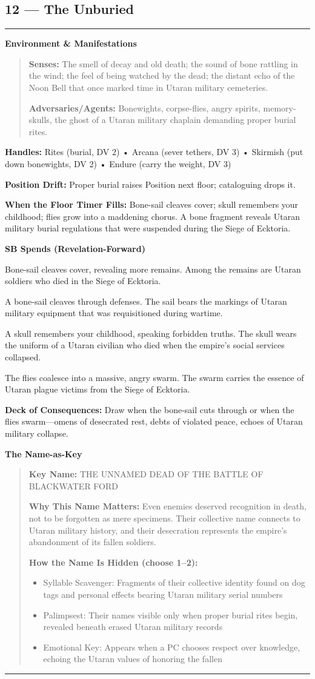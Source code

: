 \documentclass[18pt, letterpaper, twoside]{article}
\newenvironment{floorbox}[1]{%
    \begin{center}
    \begin{minipage}{0.95\textwidth}
    \subsection*{#1}
    \vspace{-0.5em}
    \rule{\textwidth}{0.5pt}
    \vspace{0.5em}
}{%
    \vspace{0.5em}
    \rule{\textwidth}{0.5pt}
    \end{minipage}
    \end{center}
}
\newenvironment{gmnote}[1]{%
    \vspace{0.5em}
    \noindent\textbf{#1}
    \begin{quote}
}{%
    \end{quote}
    \vspace{0.5em}
}
\newcommand{\handles}[1]{\noindent\textbf{Handles:} #1\par}
\newcommand{\sbitem}[2]{\item[#1 SB:] #2}
\newcommand{\deckdraw}[1]{\noindent\textbf{Deck of Consequences:} #1\par}
\newcommand{\keyname}[1]{\noindent\textbf{Key Name:} #1\par}
\newcommand{\nameimportance}[1]{\noindent\textbf{Why This Name Matters:} #1\par}
\begin{document}
\begin{floorbox}{12 --- The Unburied}
\begin{gmnote}{Environment \& Manifestations}
\textbf{Senses:} The smell of decay and old death; the sound of bone rattling in the wind; the feel of being watched by the dead; the distant echo of the Noon Bell that once marked time in Utaran military cemeteries.

\textbf{Adversaries/Agents:} Bonewights, corpse-flies, angry spirits, memory-skulls, the ghost of a Utaran military chaplain demanding proper burial rites.
\end{gmnote}

\handles{Rites (burial, DV 2) • Arcana (sever tethers, DV 3) • Skirmish (put down bonewights, DV 2) • Endure (carry the weight, DV 3)}

\textbf{Position Drift:} Proper burial raises Position next floor; cataloguing drops it.

\textbf{When the Floor Timer Fills:} Bone-sail cleaves cover; skull remembers your childhood; flies grow into a maddening chorus. A bone fragment reveals Utaran military burial regulations that were suspended during the Siege of Ecktoria.

\textbf{SB Spends (Revelation-Forward)}
\begin{description}[leftmargin=*, style=unboxed]
    \sbitem{1}{Bone-sail cleaves cover, revealing more remains. Among the remains are Utaran soldiers who died in the Siege of Ecktoria.}
    \sbitem{2}{A bone-sail cleaves through defenses. The sail bears the markings of Utaran military equipment that was requisitioned during wartime.}
    \sbitem{3}{A skull remembers your childhood, speaking forbidden truths. The skull wears the uniform of a Utaran civilian who died when the empire's social services collapsed.}
    \sbitem{4+}{The flies coalesce into a massive, angry swarm. The swarm carries the essence of Utaran plague victims from the Siege of Ecktoria.}
\end{description}

\deckdraw{Draw when the bone-sail cuts through or when the flies swarm---omens of desecrated rest, debts of violated peace, echoes of Utaran military collapse.}

\begin{gmnote}{The Name-as-Key}
\keyname{THE UNNAMED DEAD OF THE BATTLE OF BLACKWATER FORD}
\nameimportance{Even enemies deserved recognition in death, not to be forgotten as mere specimens. Their collective name connects to Utaran military history, and their desecration represents the empire's abandonment of its fallen soldiers.}

\textbf{How the Name Is Hidden (choose 1--2):}
\begin{itemize}[leftmargin=*]
    \item Syllable Scavenger: Fragments of their collective identity found on dog tags and personal effects bearing Utaran military serial numbers
    \item Palimpsest: Their names visible only when proper burial rites begin, revealed beneath erased Utaran military records
    \item Emotional Key: Appears when a PC chooses respect over knowledge, echoing the Utaran values of honoring the fallen
\end{itemize}


\end{gmnote}
\end{floorbox}
\end{document}
